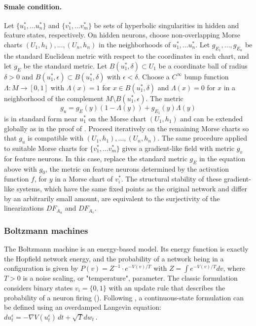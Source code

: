 \documentclass[12pt]{article}
\begin{document}
\paragraph{Smale condition.}
Let $\{ u^*_1,...u^*_n\}$ and $\{ v^*_1,...v^*_m\}$ be sets of hyperbolic singularities in hidden and feature states, respectively. On hidden neurons, choose non-overlapping Morse charts $(U_1, h_1),..., (U_n, h_n)$ in the neighborhoods of $u^*_1,...u^*_n$. Let $g_{E_1},...,g_{E_n}$ be the standard Euclidean metric with respect to the coordinates in each chart, and let $g_{E}$ be the standard metric. Let $B(u^*_1,\delta)\subset U_1$ be a coordinate ball of radius $\delta >0$ and $B(u^*_1,\epsilon)\subset B(u^*_1,\delta)$ with $\epsilon < \delta$. Choose a $C^{\infty}$ bump function $\Lambda: M \rightarrow [0,1]$ with $\Lambda(x) = 1$ for $x \in  B(u^*_1,\delta)$ and $\Lambda(x)=0$ for $x$ in a neighborhood of the complement $M \setminus B(u^*_1,\epsilon)$. The metric
\begin{equation*}
    g_u = g_E(y)(1-\Lambda(y)) + g_{E_{1}}(y)\Lambda(y)
\end{equation*}
is in standard form near $u^*_1$ on the Morse chart $(U_1, h_1)$ and can be extended globally as in the proof of . Proceed iteratively on the remaining Morse charts so that $g_u$ is compatible with $(U_1, h_1),..., (U_n, h_n)$. The same procedure applied to suitable Morse charts for $\{ v^*_1,...v^*_m\}$ gives a gradient-like field with metric $g_v$ for feature neurons. In this case, replace the standard metric $g_E$ in the equation above with $g_0$, the metric on feature neurons determined by the activation function $f$, for $y$ in a Morse chart of $v^*_i$. The structural stability of these gradient-like systems, which have the same fixed points as the original network and differ by an arbitrarily small amount, are equivalent to the surjectivity of the linearizations $DF_{A_u}$ and $DF_{A_v}$.


\subsubsection{Boltzmann machines}
The Boltzmann machine is an energy-based model. Its energy function is exactly the Hopfield network energy, and the probability of a network being in a configuration is given by $P(v) = {Z}^{-1}\cdot e^{{-{V(v)}/{T}}}$ with $Z = \int e^{{-{V(v)}/{T}}}dv$,
where $T > 0$ is a noise scaling, or "temperature", parameter. The classic formulation considers binary states $v_i = \{0,1\}$ with an update rule that describes the probability of a neuron firing (\cite{ackley1985learning}). Following , a continuous-state formulation can be defined using an overdamped Langevin equation: $d{u}^{\epsilon}_t = - \nabla V(u^{\epsilon}_t)\,dt + \sqrt{T}dw_t \,.$
\end{document}

